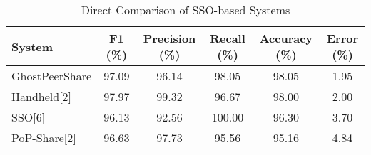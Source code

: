 \begin{table}[t]
\caption{Direct Comparison of SSO-based Systems}
\centering
\begin{tabular}{lccccc}
\hline
\textbf{System} & \textbf{F1 (\%)} & \textbf{Precision (\%)} & \textbf{Recall (\%)} & \textbf{Accuracy (\%)} & \textbf{Error (\%)} \\
\hline
GhostPeerShare & 97.09 & 96.14 & 98.05 & 98.05 & 1.95 \\
Handheld[2]    & 97.97 & 99.32 & 96.67 & 98.00 & 2.00 \\
SSO[6]         & 96.13 & 92.56 & 100.00 & 96.30 & 3.70 \\
PoP-Share[2]   & 96.63 & 97.73 & 95.56 & 95.16 & 4.84 \\
\hline
\end{tabular}
\label{table:ann_system_compare}
\end{table}
